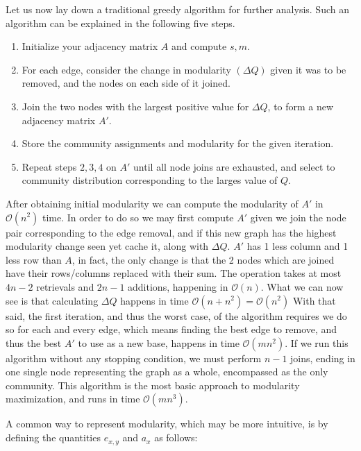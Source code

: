 \documentclass[a4paper, 10pt, twocolumn]{article}
\begin{document}
Let us now lay down a traditional greedy algorithm for further analysis.
Such an algorithm can be explained in the following five steps.

\begin{enumerate}
       \item Initialize your adjacency matrix $ A $ and compute $ s, m $.
       \item For each edge, consider the change in modularity $ (\Delta Q) $ given it was to be removed, and the nodes on each side of it joined.
       \item Join the two nodes with the largest positive value for $ \Delta Q $, to form a new adjacency matrix $ A' $.
       \item Store the community assignments and modularity for the given iteration.
       \item Repeat steps $ 2,3,4 $ on $ A' $ until all node joins are exhausted, and select to community distribution corresponding to the larges value of $ Q $.
\end{enumerate}

\noindent
After obtaining initial modularity we can compute the modularity of $ A' $ in $ \mathcal{O}(n^{2}) $ time. In order to do so we may first compute $ A' $ given we join the node pair corresponding to the edge removal, and if this new graph has the highest modularity change seen yet cache it, along with $ \Delta Q $.
$ A' $ has 1 less column and 1 less row than $ A $, in fact, the only change is that the 2 nodes which are joined have their rows/columns replaced with their sum.
The operation takes at most $ 4n -2 $ retrievals and $ 2n - 1 $ additions, happening in $ \mathcal{O}(n) $.
What we can now see is that calculating $ \Delta Q $ happens in time $ \mathcal{O}(n + n^{2}) = \mathcal{O}(n^{2})$
With that said, the first iteration, and thus the worst case, of the algorithm requires we do so for each and every edge, which means finding the best edge to remove, and thus the best $ A' $ to use as a new base, happens in time $ \mathcal{O}(mn^{2}) $.
If we run this algorithm without any stopping condition, we must perform $ n - 1 $ joins, ending in one single node representing the graph as a whole, encompassed as the only community.
This algorithm is the most basic approach to modularity maximization, and runs in time $ \mathcal{O}(mn^{3}) $.

A common way to represent modularity, which may be more intuitive, is by defining the quantities $ e_{x, y} $ and $ a_{x} $ as follows:
\end{document}
